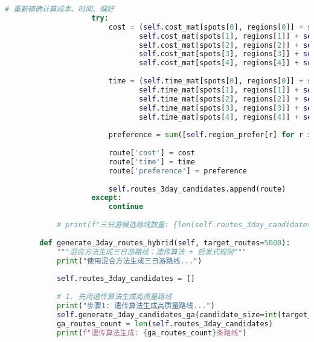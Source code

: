 \begin{lstlisting}[language=Python]
                    # 重新精确计算成本、时间、偏好
                    try:
                        cost = (self.cost_mat[spots[0], regions[0]] + self.cost_mat[spots[1], regions[0]] +
                               self.cost_mat[spots[1], regions[1]] + self.cost_mat[spots[2], regions[1]] +
                               self.cost_mat[spots[2], regions[2]] + self.cost_mat[spots[3], regions[2]] +
                               self.cost_mat[spots[3], regions[3]] + self.cost_mat[spots[4], regions[3]] +
                               self.cost_mat[spots[4], regions[4]] + self.cost_mat[spots[5], regions[4]])
                        
                        time = (self.time_mat[spots[0], regions[0]] + self.time_mat[spots[1], regions[0]] +
                               self.time_mat[spots[1], regions[1]] + self.time_mat[spots[2], regions[1]] +
                               self.time_mat[spots[2], regions[2]] + self.time_mat[spots[3], regions[2]] +
                               self.time_mat[spots[3], regions[3]] + self.time_mat[spots[4], regions[3]] +
                               self.time_mat[spots[4], regions[4]] + self.time_mat[spots[5], regions[4]])
                        
                        preference = sum([self.region_prefer[r] for r in regions]) + 6
                        
                        route['cost'] = cost
                        route['time'] = time
                        route['preference'] = preference
                        
                        self.routes_3day_candidates.append(route)
                    except:
                        continue
            
            # print(f"三日游候选路线数量: {len(self.routes_3day_candidates)}") # 避免过多打印
        
        def generate_3day_routes_hybrid(self, target_routes=5000):
            """混合方法生成三日游路线：遗传算法 + 启发式规则"""
            print("使用混合方法生成三日游路线...")
            
            self.routes_3day_candidates = []
            
            # 1. 先用遗传算法生成高质量路线
            print("步骤1: 遗传算法生成高质量路线...")
            self.generate_3day_candidates_ga(candidate_size=int(target_routes * 0.1), population_size=1000, generations=50) # 减少GA生成的比例
            ga_routes_count = len(self.routes_3day_candidates)
            print(f"遗传算法生成: {ga_routes_count}条路线")
            

\end{lstlisting}

